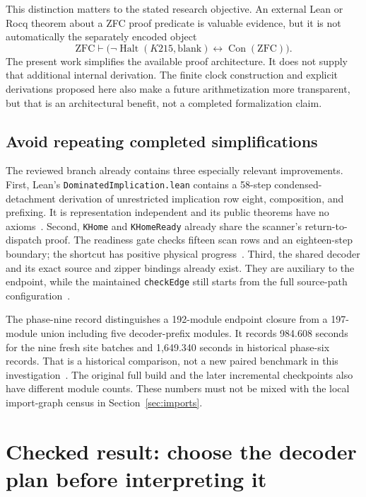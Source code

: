 \documentclass[11pt,letterpaper]{article}
\newcommand{\code}[1]{\texttt{\small #1}}
\newcommand{\Con}{\operatorname{Con}}
\begin{document}
This distinction matters to the stated research objective. An external Lean or Rocq
theorem about a ZFC proof predicate is valuable evidence, but it is not automatically
the separately encoded object
\[
  \mathrm{ZFC}\vdash
  \bigl(\neg\operatorname{Halt}(K215,\mathrm{blank})\leftrightarrow\Con(\mathrm{ZFC})\bigr).
\]
The present work simplifies the available proof architecture. It does not supply that
additional internal derivation. The finite clock construction and explicit derivations
proposed here also make a future arithmetization more transparent, but that is an
architectural benefit, not a completed formalization claim.

\subsection{Avoid repeating completed simplifications}

The reviewed branch already contains three especially relevant improvements.
First, Lean's \code{DominatedImplication.lean} contains a 58-step condensed-detachment
derivation of unrestricted implication row eight, composition, and prefixing. It is
representation independent and its public theorems have no axioms~\cite{rho8}.
Second, \code{KHome} and \code{KHomeReady} already share the scanner's return-to-dispatch
proof. The readiness gate checks fifteen scan rows and an eighteen-step boundary;
the shortcut has positive physical progress~\cite{phase9,home}.
Third, the shared decoder and its exact source and zipper bindings already exist.
They are auxiliary to the endpoint, while the maintained \code{checkEdge} still starts
from the full source-path configuration~\cite{decoder,sim}.

The phase-nine record distinguishes a 192-module endpoint closure from a 197-module
union including five decoder-prefix modules. It records 984.608 seconds for the nine
fresh site batches and 1,649.340 seconds in historical phase-six records. That is a
historical comparison, not a new paired benchmark in this investigation~\cite{phase9}.
The original full build and the later incremental checkpoints also have different
module counts. These numbers must not be mixed with the local import-graph census
in Section~\ref{sec:imports}.

\section{Checked result: choose the decoder plan before interpreting it}
\label{sec:uniform}
\end{document}
